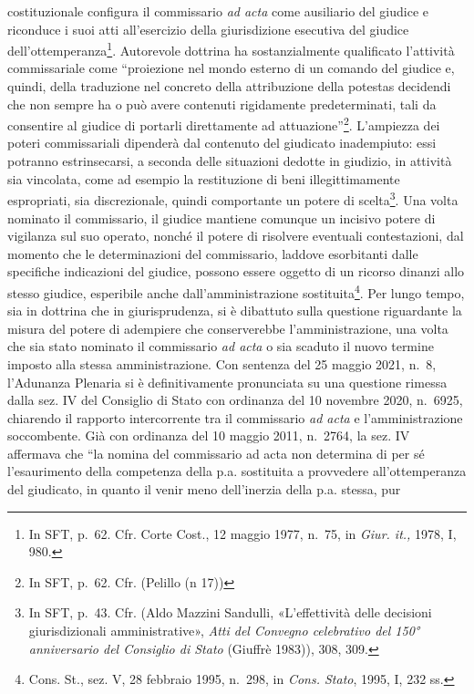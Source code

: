 \documentclass[12pt,it,a4paper,]{report}
\begin{document}
costituzionale configura il commissario \emph{ad acta} come ausiliario
del giudice e riconduce i suoi atti all'esercizio della giurisdizione
esecutiva del giudice dell'ottemperanza\footnote{In SFT, p.~62. Cfr.
  Corte Cost., 12 maggio 1977, n.~75, in \emph{Giur. it.,} 1978, I, 980.}.
Autorevole dottrina ha sostanzialmente qualificato l'attività
commissariale come ``proiezione nel mondo esterno di un comando del
giudice e, quindi, della traduzione nel concreto della attribuzione
della potestas decidendi che non sempre ha o può avere contenuti
rigidamente predeterminati, tali da consentire al giudice di portarli
direttamente ad attuazione''\footnote{In SFT, p.~62. Cfr. (Pelillo (n
  17))}. L'ampiezza dei poteri commissariali dipenderà dal contenuto del
giudicato inadempiuto: essi potranno estrinsecarsi, a seconda delle
situazioni dedotte in giudizio, in attività sia vincolata, come ad
esempio la restituzione di beni illegittimamente espropriati, sia
discrezionale, quindi comportante un potere di scelta\footnote{In SFT,
  p.~43. Cfr. (Aldo Mazzini Sandulli, {«L'effettività delle decisioni
  giurisdizionali amministrative»}, \emph{Atti del Convegno celebrativo
  del 150° anniversario del Consiglio di Stato} (Giuffrè 1983)), 308,
  309.}. Una volta nominato il commissario, il giudice mantiene comunque
un incisivo potere di vigilanza sul suo operato, nonché il potere di
risolvere eventuali contestazioni, dal momento che le determinazioni del
commissario, laddove esorbitanti dalle specifiche indicazioni del
giudice, possono essere oggetto di un ricorso dinanzi allo stesso
giudice, esperibile anche dall'amministrazione sostituita\footnote{Cons.
  St., sez. V, 28 febbraio 1995, n.~298, in \emph{Cons. Stato}, 1995, I,
  232 ss.}. Per lungo tempo, sia in dottrina che in giurisprudenza, si è
dibattuto sulla questione riguardante la misura del potere di adempiere
che conserverebbe l'amministrazione, una volta che sia stato nominato il
commissario \emph{ad acta} o sia scaduto il nuovo termine imposto alla
stessa amministrazione. Con sentenza del 25 maggio 2021, n.~8,
l'Adunanza Plenaria si è definitivamente pronunciata su una questione
rimessa dalla sez. IV del Consiglio di Stato con ordinanza del 10
novembre 2020, n.~6925, chiarendo il rapporto intercorrente tra il
commissario \emph{ad acta} e l'amministrazione soccombente. Già con
ordinanza del 10 maggio 2011, n.~2764, la sez. IV affermava che ``la
nomina del commissario ad acta non determina di per sé l'esaurimento
della competenza della p.a. sostituita a provvedere all'ottemperanza del
giudicato, in quanto il venir meno dell'inerzia della p.a. stessa, pur
\end{document}
